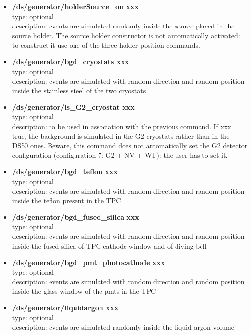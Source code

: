 \documentclass[twocolumn, 10pt]{article}
\begin{document}
\begin{itemize}
\item \textbf{/ds/generator/holderSource\_on xxx}\\
type: optional \\
description: events are simulated randomly inside the source placed in the source holder. The source holder constructor is not automatically activated: to construct it use one of the three holder position commands.


\item \textbf{/ds/generator/bgd\_cryostats xxx}\\
type: optional \\
description: events are simulated with random direction and random position inside the stainless steel of the two cryostats

\item \textbf{/ds/generator/is\_G2\_cryostat xxx}\\
type: optional\\
description: to be used in association with the previous command.
If xxx = true, the background is simulated in the G2 cryostats rather than in the DS50 ones.
Beware, this command does not automatically set the G2 detector configuration (configuration 7: G2 + NV + WT): the user has to set it.

\item \textbf{/ds/generator/bgd\_teflon xxx}\\
type: optional \\
description: events are simulated with random direction and random position inside the teflon present in the TPC

\item \textbf{/ds/generator/bgd\_fused\_silica xxx}\\
type: optional \\
description: events are simulated with random direction and random position inside the fused silica of TPC cathode window and of diving bell

\item \textbf{/ds/generator/bgd\_pmt\_photocathode xxx}\\
type: optional \\
description: events are simulated with random direction and random position inside the glass window of the pmts in the TPC

\item \textbf{/ds/generator/liquidargon xxx}\\
type: optional \\
description: events are simulated randomly inside the liquid argon volume



\end{itemize}
\end{document}

